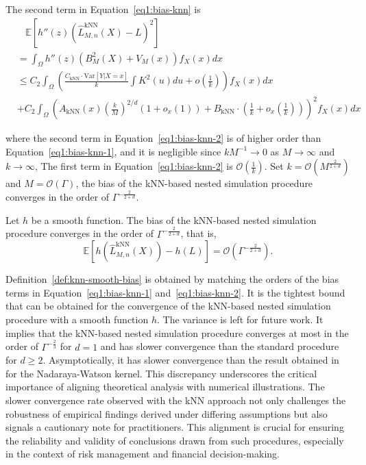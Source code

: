 The second term in Equation~\ref{eq1:bias-knn} is 
\begin{align} \label{eq1:bias-knn-2}
    & ~~~~ \mathbb{E} \left[ h''(z) \left( \hat{L}^{\text{kNN}}_{M, n}(X) - L \right)^2 \right]  \nonumber \\
    & = \int_{\Omega} h''(z) \left(B_M^2(X) + V_M(x)\right) f_X(x) dx \nonumber \\
    & \leq C_2 \int_{\Omega} \left( \frac{C_{\text{kNN}} \cdot \text{Var}[Y| X = x]}{k} \int K^2(u) du + o\left(\frac{1}{k}\right) \right) f_X(x) dx \nonumber \\
    & + C_2 \int_{\Omega} \left( A_{\text{kNN}}(x) \left(\frac{k}{M}\right)^{2/d} \left(1+o_x(1)\right) + B_{\text{kNN}} \cdot \left(\frac{1}{k} + o_x\left(\frac{1}{k}\right)\right) \right)^2 f_X(x) dx 
\end{align}

where the second term in Equation~\ref{eq1:bias-knn-2} is of higher order than Equation~\ref{eq1:bias-knn-1}, and it is negligible since $kM^{-1} \rightarrow 0$ as $M \rightarrow \infty$ and $k \rightarrow \infty$, 
The first term in Equation~\ref{eq1:bias-knn-2} is $\mathcal{O}\left(\frac{1}{k}\right)$.
Set $k = \mathcal{O}(M^{\frac{2}{2+d}})$ and $M = \mathcal{O}(\Gamma)$, the bias of the kNN-based nested simulation procedure converges in the order of $\Gamma^{-\frac{2}{2+d}}$.

\begin{definition} \label{def:knn-smooth-bias}
    Let $h$ be a smooth function. 
    The bias of the kNN-based nested simulation procedure converges in the order of $\Gamma^{-\frac{2}{2+d}}$, that is,
    $$ \mathbb{E} \left[ h(\hat{L}^{\text{kNN}}_{M, n}(X)) - h(L) \right]  = \mathcal{O}(\Gamma^{-\frac{2}{2+d}}).$$
\end{definition}

Definition~\ref{def:knn-smooth-bias} is obtained by matching the orders of the bias terms in Equation~\ref{eq1:bias-knn-1} and~\ref{eq1:bias-knn-2}.
It is the tightest bound that can be obtained for the convergence of the kNN-based nested simulation procedure with a smooth function $h$.
The variance is left for future work.
It implies that the kNN-based nested simulation procedure converges at most in the order of $\Gamma^{-\frac{2}{3}}$ for $d = 1$ and has slower convergence than the standard procedure for $d \geq 2$.
Asymptotically, it has slower convergence than the result obtained in~\cite{hong2017kernel} for the Nadaraya-Watson kernel.
This discrepancy underscores the critical importance of aligning theoretical analysis with numerical illustrations.
The slower convergence rate observed with the kNN approach not only challenges the robustness of empirical findings derived under differing assumptions but also signals a cautionary note for practitioners. 
This alignment is crucial for ensuring the reliability and validity of conclusions drawn from such procedures, especially in the context of risk management and financial decision-making.

